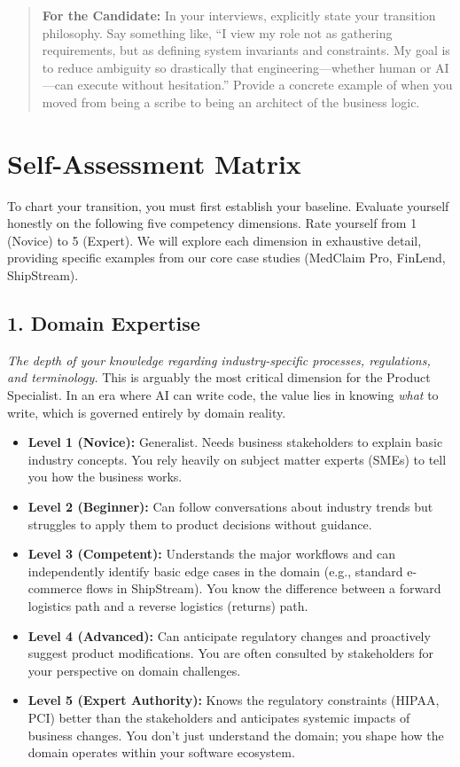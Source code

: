 \begin{quote}
\textbf{For the Candidate:} In your interviews, explicitly state your
transition philosophy. Say something like, ``I view my role not as
gathering requirements, but as defining system invariants and
constraints. My goal is to reduce ambiguity so drastically that
engineering---whether human or AI---can execute without hesitation.''
Provide a concrete example of when you moved from being a scribe to
being an architect of the business logic.
\end{quote}

\bigskip

\section{Self-Assessment Matrix}\label{self-assessment-matrix}

To chart your transition, you must first establish your baseline.
Evaluate yourself honestly on the following five competency dimensions.
Rate yourself from 1 (Novice) to 5 (Expert). We will explore each
dimension in exhaustive detail, providing specific examples from our
core case studies (MedClaim Pro, FinLend, ShipStream).

\subsection{1. Domain Expertise}\label{domain-expertise}

\emph{The depth of your knowledge regarding industry-specific processes,
regulations, and terminology.} This is arguably the most critical
dimension for the Product Specialist. In an era where AI can write code,
the value lies in knowing \emph{what} to write, which is governed
entirely by domain reality.

\begin{itemize}
\tightlist
\item
  \textbf{Level 1 (Novice):} Generalist. Needs business stakeholders to
  explain basic industry concepts. You rely heavily on subject matter
  experts (SMEs) to tell you how the business works.
\item
  \textbf{Level 2 (Beginner):} Can follow conversations about industry
  trends but struggles to apply them to product decisions without
  guidance.
\item
  \textbf{Level 3 (Competent):} Understands the major workflows and can
  independently identify basic edge cases in the domain (e.g., standard
  e-commerce flows in ShipStream). You know the difference between a
  forward logistics path and a reverse logistics (returns) path.
\item
  \textbf{Level 4 (Advanced):} Can anticipate regulatory changes and
  proactively suggest product modifications. You are often consulted by
  stakeholders for your perspective on domain challenges.
\item
  \textbf{Level 5 (Expert Authority):} Knows the regulatory constraints
  (HIPAA, PCI) better than the stakeholders and anticipates systemic
  impacts of business changes. You don't just understand the domain; you
  shape how the domain operates within your software ecosystem.
\end{itemize}


